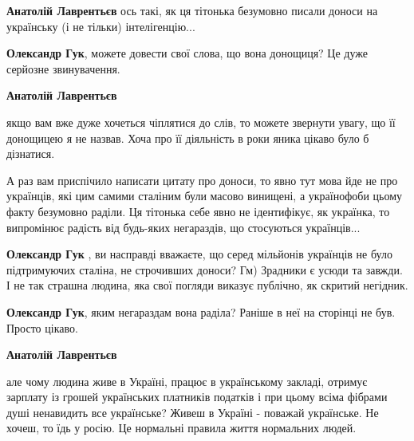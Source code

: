 \begin{itemize}
\begin{itemize}
\textbf{Анатолій Лаврентьєв} ось такі, як ця тітонька безумовно писали доноси на українську (і не тільки) інтелігенцію...

 
\textbf{Олександр Гук}, можете довести свої слова, що вона донощиця? Це дуже серйозне звинувачення.

 
\textbf{Анатолій Лаврентьєв} 

якщо вам вже дуже хочеться чіплятися до слів, то можете звернути увагу, що її
донощицею я не назвав. Хоча про її діяльність в роки яника цікаво було б
дізнатися. 

А раз вам приспічило написати цитату про доноси, то явно тут мова йде не про
українців, які цим самими сталіним були масово винищені, а українофоби цьому
факту безумовно раділи. Ця тітонька себе явно не ідентифікує, як українка, то
випромінює радість від будь-яких негараздів, що стосуються українців...

 
\textbf{Олександр Гук} , ви насправді вважаєте, що серед мільйонів українців не було підтримуючих сталіна, не строчивших доноси? Гм) Зрадники є усюди та завжди. І не так страшна людина, яка свої погляди виказує публічно, як скритий негідник.

 
\textbf{Олександр Гук}, яким негараздам вона раділа? Раніше в неї на сторінці не був. Просто цікаво.

 
\textbf{Анатолій Лаврентьєв} 

але чому людина живе в Україні, працює в українському закладі, отримує зарплату
із грошей українських платників податків і при цьому всіма фібрами душі
ненавидить все українське? Живеш в Україні - поважай українське. Не хочеш, то
їдь у росію. Це нормальні правила життя нормальних людей.



\end{itemize}
\end{itemize}
